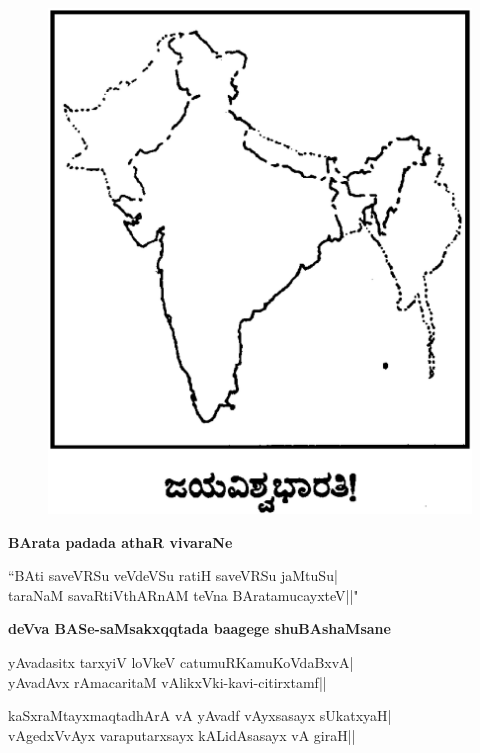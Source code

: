 \begin{figure}[H]
\centering
{\includegraphics[scale=.19]{0019.eps}}
\end{figure}

\noindent
{\large\bf BArata padada athaR vivaraNe}\label{page20}
\medskip

\begin{shloka}
``BAti saveVRSu veVdeVSu ratiH saveVRSu jaMtuSu|\\\label{20}
taraNaM savaRtiVthARnAM teVna BAratamucayxteV||"
\end{shloka}

\medskip
\noindent
{\large\bf deVva BASe-saMsakxqqtada baagege shuBAshaMsane}\label{page20}
\medskip

\begin{shloka}
yAvadasitx tarxyiV loVkeV catumuRKamuKoVdaBxvA|\\\label{20}
yAvadAvx rAmacaritaM vAlikxVki-kavi-citirxtamf||
\end{shloka}

\begin{shloka}
kaSxraMtayxmaqtadhArA vA yAvadf vAyxsasayx sUkatxyaH|\\
vAgedxVvAyx varaputarxsayx kALidAsasayx vA giraH||
\end{shloka}

